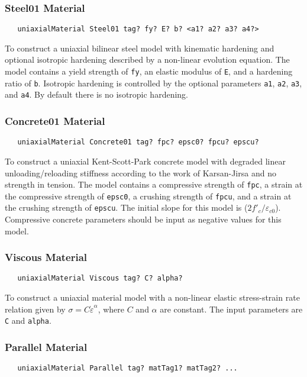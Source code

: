 \documentclass[12pt]{article}
\begin{document}
\subsubsection{Steel01 Material}
{\sf\small
\begin{verbatim}
   uniaxialMaterial Steel01 tag? fy? E? b? <a1? a2? a3? a4?>
\end{verbatim}
}

\noindent To construct a uniaxial bilinear steel model with kinematic
hardening and optional isotropic hardening described by a non-linear
evolution equation. The model contains a yield strength of {\tt fy}, an
elastic modulus of {\tt E}, and a hardening ratio of {\tt b}.
Isotropic hardening is controlled by the optional parameters
{\tt a1}, {\tt a2}, {\tt a3}, and {\tt a4}. By default there is no
isotropic hardening.

\subsubsection{Concrete01 Material}
{\sf\small
\begin{verbatim}
   uniaxialMaterial Concrete01 tag? fpc? epsc0? fpcu? epscu?
\end{verbatim}
}

\noindent To construct a uniaxial Kent-Scott-Park concrete model with degraded 
linear unloading/reloading stiffness according to the work of Karsan-Jirsa and no
strength in tension. The model contains a compressive strength of {\tt fpc},
a strain at the compressive strength of {\tt epsc0}, a crushing strength of
{\tt fpcu}, and a strain at the crushing strength of {\tt epscu}.
The initial slope
for this model is ($2f'_c/\varepsilon_{c0}$). Compressive
concrete parameters should be input as negative values for
this model.

\subsubsection{Viscous Material}
{\sf\small
\begin{verbatim}
   uniaxialMaterial Viscous tag? C? alpha?
\end{verbatim}
}

\noindent To construct a uniaxial material model with a non-linear elastic
stress-strain rate relation given by $\sigma = C\dot{\varepsilon}^\alpha$,
where $C$ and $\alpha$ are constant. The input parameters are
{\tt C} and {\tt alpha}.

\subsubsection{Parallel Material}
{\sf\small
\begin{verbatim}
   uniaxialMaterial Parallel tag? matTag1? matTag2? ...
\end{verbatim}
}
\end{document}
